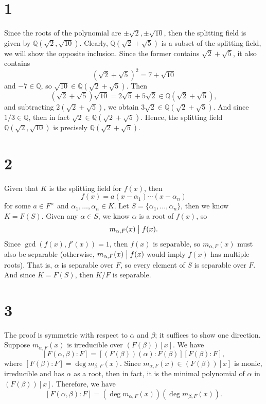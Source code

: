 \documentclass[12pt]{article}
\theoremstyle{definition}
\newcommand{\Q}{\mathbb{Q}}
\newcommand{\divides}{\bigm|}
\begin{document}
\thispagestyle{title}


\section*{1}

Since the roots of the polynomial are $\pm\sqrt{2}, \pm\sqrt{10}$, then the splitting field is given by $\Q(\sqrt{2}, \sqrt{10})$. Clearly, $\Q(\sqrt{2} + \sqrt{5})$ is a subset of the splitting field, we will show the opposite inclusion. Since the former contains $\sqrt{2} + \sqrt{5}$, it also contains
\[
    (\sqrt{2} + \sqrt{5})^2 = 7 + \sqrt{10}
\]
and $-7 \in \Q$, so $\sqrt{10} \in \Q(\sqrt{2} + \sqrt{5})$. Then
\[
    (\sqrt{2} + \sqrt{5})\sqrt{10} = 2\sqrt{5} + 5\sqrt{2} \in \Q(\sqrt{2} + \sqrt{5}),
\]
and subtracting $2(\sqrt{2} + \sqrt{5})$, we obtain $3\sqrt{2} \in \Q(\sqrt{2} + \sqrt{5})$. And since $1/3 \in \Q$, then in fact $\sqrt{2} \in \Q(\sqrt{2} + \sqrt{5})$. Hence, the splitting field $\Q(\sqrt{2}, \sqrt{10})$ is precisely $\Q(\sqrt{2} + \sqrt{5})$.


\newpage
\section*{2}


Given that $K$ is the splitting field for $f(x)$, then
\[
    f(x) = a(x - \alpha_1) \cdots (x - \alpha_n)
\]
for some $a \in F^\times$ and $\alpha_1, \dots, \alpha_n \in K$. Let $S = \{\alpha_1, \dots, \alpha_n\}$, then we know $K = F(S)$. Given any $\alpha \in S$, we know $\alpha$ is a root of $f(x)$, so
\[
    m_{\alpha, F}(x) \divides f(x).
\]
Since $\gcd(f(x), f'(x)) = 1$, then $f(x)$ is separable, so $m_{\alpha, F}(x)$ must also be separable (otherwise, $m_{\alpha, F}(x) \divides f(x)$ would imply $f(x)$ has multiple roots). That is, $\alpha$ is separable over $F$, so every element of $S$ is separable over $F$. And since $K = F(S)$, then $K/F$ is separable.


\newpage
\section*{3}

The proof is symmetric with respect to $\alpha$ and $\beta$; it suffices to show one direction. Suppose $m_{\alpha, F}(x)$ is irreducible over $(F(\beta))[x]$. We have 
\[
    [F(\alpha, \beta) : F] = [(F(\beta))(\alpha) : F(\beta)][F(\beta) : F],
\]
where $[F(\beta) : F] = \deg m_{\beta, F}(x)$. Since $m_{\alpha, F}(x) \in (F(\beta))[x]$ is monic, irreducible  and has $\alpha$ as a root, then in fact, it is the minimal polynomial of $\alpha$ in $(F(\beta))[x]$. Therefore, we have
\[
    [F(\alpha, \beta) : F] = (\deg m_{\alpha, F}(x))(\deg m_{\beta, F}(x)).
\]
\end{document}
